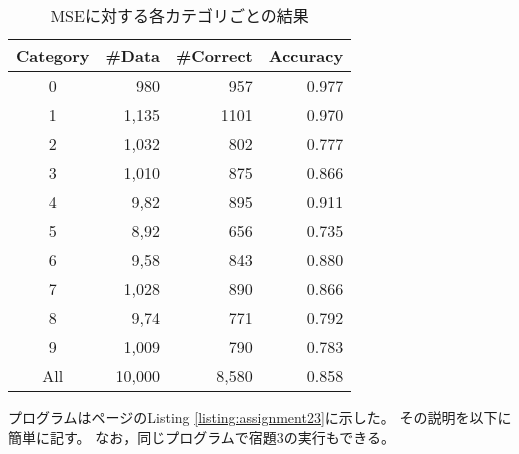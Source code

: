 \documentclass[class=jsarticle, crop=false, dvipdfmx, fleqn]{standalone}
\begin{document}
\begin{table}[H]
	\centering
	\caption{MSEに対する各カテゴリごとの結果}
	\begin{tabular}{crrr}
		Category & {\#}Data & {\#}Correct & Accuracy \\ \hline
        0 & 980 & 957 & 0.977 \\
        1 & 1,135 & 1101 & 0.970 \\
        2 & 1,032 & 802 & 0.777 \\
        3 & 1,010 & 875 & 0.866 \\
        4 & 9,82 & 895 & 0.911 \\
        5 & 8,92 & 656 & 0.735 \\
        6 & 9,58 & 843 & 0.880 \\
        7 & 1,028 & 890 & 0.866 \\
        8 & 9,74 & 771 & 0.792 \\
        9 & 1,009 & 790 & 0.783 \\
        All & 10,000 & 8,580 & 0.858 \\
	\end{tabular}
	\label{tab:result_MSE}
\end{table}

\clearpage

プログラムは\pageref{listing:assignment23}ページのListing \ref{listing:assignment23}に示した。
その説明を以下に簡単に記す。
なお，同じプログラムで宿題3の実行もできる。
\end{document}
